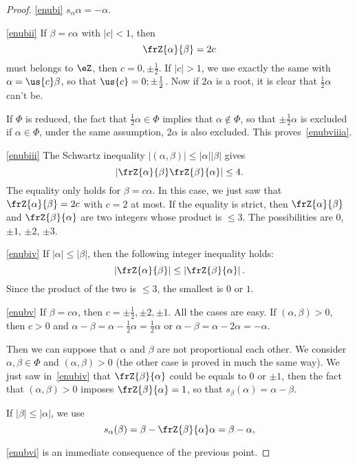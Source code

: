 \begin{proof}
	\ref{enubi} $s_{\alpha}\alpha=-\alpha$.

	\ref{enubii} If $\beta=c\alpha$ with $|c|<1$, then
	\[
		\frZ{\alpha}{\beta}=2c
	\]
	must belongs to $\eZ$, then $c=0,\pm\frac{1}{2}$. If $|c|>1$, we use exactly the same with $\alpha=\us{c}\beta$, so that $\us{c}=0;\pm\frac{1}{2}$. Now if $2\alpha$ is a root, it is clear that $\frac{1}{2}\alpha$ can't be.

	If $\Phi$ is reduced, the fact that $\frac{1}{2}\alpha\in\Phi$ implies that $\alpha\notin\Phi$, so that $\pm\frac{1}{2}\alpha$ is excluded if $\alpha\in\Phi$, under the same assumption, $2\alpha$ is also excluded. This proves~\ref{enubviiia}.

	\ref{enubiii} The Schwartz inequality $|(\alpha,\beta)|\leq|\alpha||\beta|$ gives
	\[
		\left|   \frZ{\alpha}{\beta}\frZ{\beta}{\alpha}     \right|\leq 4.
	\]
	The equality only holds for $\beta=c\alpha$. In this case, we just saw that $\frZ{\alpha}{\beta}=2c$ with $c=2$ at most. If the equality is strict, then $\frZ{\alpha}{\beta}$ and $\frZ{\beta}{\alpha}$ are two integers whose product is $\leq 3$. The possibilities are $0$, $\pm 1$, $\pm 2$, $\pm 3$.

	\ref{enubiv} If $|\alpha|\leq|\beta|$, then the following integer inequality holds:
	\[
		\left|\frZ{\alpha}{\beta}   \right|\leq\left|\frZ{\beta}{\alpha}   \right|.
	\]
	Since the product of the two  is $\leq 3$, the smallest is $0$ or $1$.

	\ref{enubv}
	If $\beta=c\alpha$, then $c=\pm\frac{1}{2},\pm 2,\pm 1$. All the cases are easy. If $(\alpha,\beta)>0$, then $c>0$ and $\alpha-\beta= \alpha-\frac{1}{2}\alpha=\frac{1}{2}\alpha$ or $\alpha-\beta=\alpha-2\alpha=-\alpha$.

	Then we can suppose that $\alpha$ and $\beta$ are not proportional each other. We consider $\alpha,\beta\in\Phi$ and $(\alpha,\beta)>0$ (the other case is proved in much the same way). We just saw in~\ref{enubiv} that $\frZ{\beta}{\alpha}$ could be equals to $0$ or $\pm 1$, then the fact that $(\alpha,\beta)>0$ imposes $\frZ{\beta}{\alpha}=1$, so that $s_{\beta}(\alpha)=\alpha-\beta$.

	If $|\beta|\leq|\alpha|$, we use
	\begin{equation}
		s_{\alpha}(\beta)=\beta-\frZ{\beta}{\alpha}\alpha
		=\beta-\alpha,
	\end{equation}

	\ref{enubvi} is an immediate consequence of the previous point.


\end{proof}
